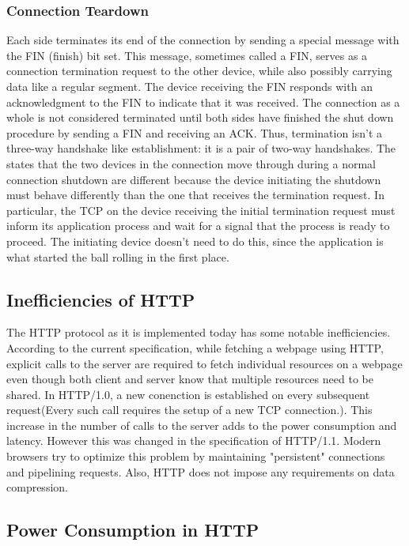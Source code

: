\documentclass{sigplanconf}
\begin{document}
\subsubsection{Connection Teardown}
Each side terminates its end of the connection by sending a special message with the FIN (finish) bit set. This message, sometimes called a FIN, serves as a connection termination request to the other device, while also possibly carrying data like a regular segment. The device receiving the FIN responds with an acknowledgment to the FIN to indicate that it was received. The connection as a whole is not considered terminated until both sides have finished the shut down procedure by sending a FIN and receiving an ACK.
Thus, termination isn't a three-way handshake like establishment: it is a pair of two-way handshakes. The states that the two devices in the connection move through during a normal connection shutdown are different because the device initiating the shutdown must behave differently than the one that receives the termination request. In particular, the TCP on the device receiving the initial termination request must inform its application process and wait for a signal that the process is ready to proceed. The initiating device doesn't need to do this, since the application is what started the ball rolling in the first place.

\subsection{Inefficiencies of HTTP}
The HTTP protocol as it is implemented today has some notable inefficiencies. According to the current specification, while fetching a webpage using HTTP, explicit calls to the server are required to fetch individual resources on a webpage even though both client and server know that multiple resources need to be shared. In HTTP/1.0, a new conenction is established on every subsequent request(Every such call requires the setup of a new TCP connection.). This increase in the number of calls to the server adds to the power consumption and latency. However this was changed in the specification of HTTP/1.1. Modern browsers try to  optimize this problem by maintaining "persistent" connections and pipelining requests. Also, HTTP does not  impose any requirements on data compression. 


\subsection{Power Consumption in HTTP}
\end{document}
